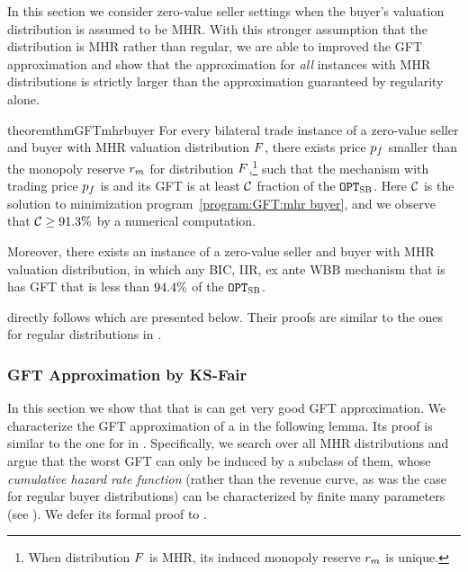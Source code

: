 In this section we consider zero-value seller settings when the buyer's valuation distribution is assumed to be MHR. With this stronger assumption that the distribution is MHR rather than regular, we are able to improved the GFT approximation and show that the approximation for \emph{all} instances with MHR distributions is strictly larger than the approximation guaranteed by regularity alone.


\begin{restatable}{theorem}{thmGFTmhrbuyer}
\label{thm:improved GFT:mhr buyer} 
    For every bilateral trade instance of a zero-value seller and buyer with MHR valuation distribution $F$, there exists price $p_f$ smaller than the monopoly reserve $r_m$ for distribution $F$,\footnote{When distribution $F$ is MHR, its induced monopoly reserve $r_m$ is unique.} 
    such that the {\FixPrice} mechanism with trading price $p_f$ is {\ksfair} and its GFT is at least $\mathcal{C}$ fraction of the {\SecondBest} $\texttt{OPT}_{\textsc{SB}}$. Here $\mathcal{C}$ is the solution to minimization program~\ref{program:GFT:mhr buyer},  
    and we observe that 
    $\mathcal{C}\geq {91.3\%}$ by a numerical computation.

    Moreover, there exists an instance of a zero-value seller and buyer with MHR valuation distribution, in which any BIC, IIR, ex ante WBB mechanism that is {\ksfair} has GFT that is less than  ${94.4\%}$ of the {\SecondBest} $\texttt{OPT}_{\textsc{SB}}$.
\end{restatable}

 directly follows  which are presented below. Their proofs are similar to the ones for regular distributions in . 


\subsubsection{GFT Approximation by KS-Fair {\FixPrice}}

In this section we show that {\FixPrice} that is {\ksfair} can get very good GFT approximation. We characterize the GFT approximation of a {\ksfair} {\FixPrice} in the following lemma. Its proof is similar to the one for  in . Specifically, we search over all MHR distributions and argue that the worst GFT can only be induced by a subclass of them, whose \emph{cumulative hazard rate function} (rather than the revenue curve, as was the case for regular buyer distributions) can be characterized by finite many parameters (see ). We defer its formal proof to .

